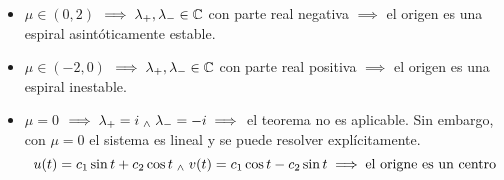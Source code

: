 \begin{ejem}
\begin{itemize}
		\item $\mu \in (0,2)$ $\implies \lambda_+, \lambda_- \in \mathbb{C}$ con parte real negativa $\implies$ el origen es una espiral asintóticamente estable.
		\item $\mu \in (-2, 0)$ $\implies \lambda_+, \lambda_- \in \mathbb{C}$ con parte real positiva $\implies$ el origen es una espiral inestable.
		\item $\mu = 0$ $\implies \lambda_+ = i \; _{\wedge} \; \lambda_- = -i \implies$ el teorema no es aplicable. Sin embargo, con $\mu = 0$ el sistema es lineal y se puede resolver explícitamente.
		      \[u(t) = c_1 \sin{t} + c_2 \cos{t} \; _{\wedge} \; v(t) = c_1 \cos{t} - c_2 \sin{t} \implies \text{el origne es un centro}\]
	\end{itemize}
\end{ejem}
